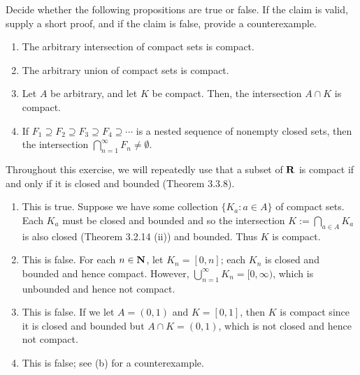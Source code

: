 \documentclass{lew98_solutions}
\begin{document}
\begin{exercise}
\label{ex:3.3.5}
    Decide whether the following propositions are true or false. If the claim is valid, supply a short proof, and if the claim is false, provide a counterexample.
    \begin{enumerate}
        \item The arbitrary intersection of compact sets is compact.

        \item The arbitrary union of compact sets is compact.

        \item Let \( A \) be arbitrary, and let \( K \) be compact. Then, the intersection \( A \cap K \) is compact.

        \item If \( F_1 \supseteq F_2 \supseteq F_3 \supseteq F_4 \supseteq \cdots \) is a nested sequence of nonempty closed sets, then the intersection \( \bigcap_{n=1}^{\infty} F_n \neq \emptyset \).
    \end{enumerate}
\end{exercise}

\begin{solution}
    Throughout this exercise, we will repeatedly use that a subset of \( \mathbf{R} \) is compact if and only if it is closed and bounded (Theorem 3.3.8).
    \begin{enumerate}
        \item This is true. Suppose we have some collection \( \{ K_a : a \in A \} \) of compact sets. Each \( K_a \) must be closed and bounded and so the intersection \( K := \bigcap_{a \in A} K_a \) is also closed (Theorem 3.2.14 (ii)) and bounded. Thus \( K \) is compact.

        \item This is false. For each \( n \in \mathbf{N} \), let \( K_n = [0, n] \); each \( K_n \) is closed and bounded and hence compact. However, \( \bigcup_{n=1}^{\infty} K_n = [0, \infty) \), which is unbounded and hence not compact.

        \item This is false. If we let \( A = (0, 1) \) and \( K = [0, 1] \), then \( K \) is compact since it is closed and bounded but \( A \cap K = (0, 1) \), which is not closed and hence not compact.

        \item This is false; see  (b) for a counterexample.
    \end{enumerate}
\end{solution}
\end{document}
